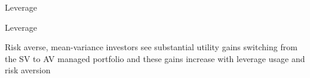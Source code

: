 \documentclass{beamer}
\begin{document}

\begin{frame}{Leverage}
	\begin{adjustbox}{width=\textwidth}
		
	\end{adjustbox}
\end{frame}

\begin{frame}{Leverage}
	\begin{adjustbox}{width=\textwidth}
		
	\end{adjustbox}
	Risk averse, mean-variance investors see substantial utility gains switching from the SV to AV managed portfolio and these gains increase with leverage usage and risk aversion
\end{frame}

% 	
%
\end{document}
